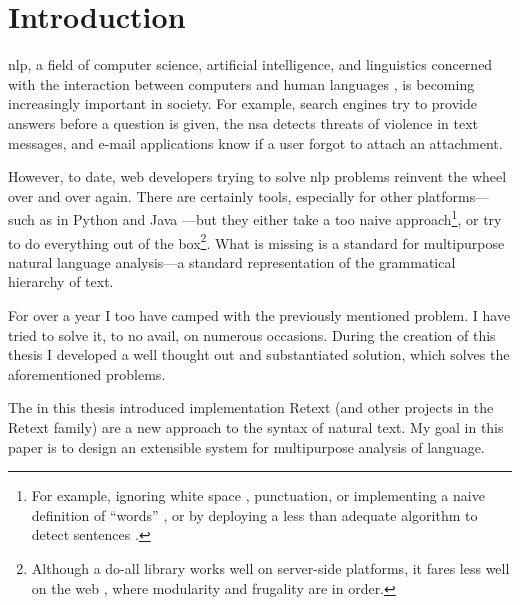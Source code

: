 
\begingroup
\let\clearpage\relax
\let\cleardoublepage\relax
\let\cleardoublepage\relax

\chapter*{Introduction}

\Gls{nlp}, a field of computer science, artificial intelligence, and
linguistics concerned with the interaction between computers and human
languages \autocite[according to WikiPedia, see
][]{wikipedia-natural-language-processing}, is becoming increasingly
important in society. For example, search engines try to provide answers
before a question is given, the \gls{nsa} detects threats of violence in text
messages, and e-mail applications know if a user forgot to attach an
attachment.

However, to date, web developers trying to solve \gls{nlp} problems
reinvent the wheel over and over again. There are certainly tools,
especially for other platforms---such as in Python
\autocite{nltk-source} and Java \autocite{opennlp-source}---but they either
take a too naive approach\footnote{For example, ignoring white space
  \autocite[see][]{loadfive/knwl-source-code}, punctuation, or
  implementing a naive definition of ``words'' \autocite[such
  as][]{nhunzaker/speakeasy-source-code}, or by deploying a less than
  adequate algorithm to detect sentences \autocite[such
  as][]{nytimes/emphasis-source-code}.}, or try to do everything out of
the box\footnote{Although a do-all library works well on server-side
  platforms, it fares less well on the web \autocite[such
  as][]{NaturalNode/natural-source-code}, where modularity and frugality
  are in order.}. What is missing is a standard for multipurpose natural
language analysis---a standard representation of the grammatical
hierarchy of text.

For over a year I too have camped with the previously mentioned problem.
I have tried to solve it, to no avail, on numerous occasions. During the
creation of this thesis I developed a well thought out and substantiated
solution, which solves the aforementioned problems.

The in this thesis introduced implementation Retext (and other projects
in the Retext family) are a new approach to the syntax of natural text.
My goal in this paper is to design an extensible system for multipurpose
analysis of language.

